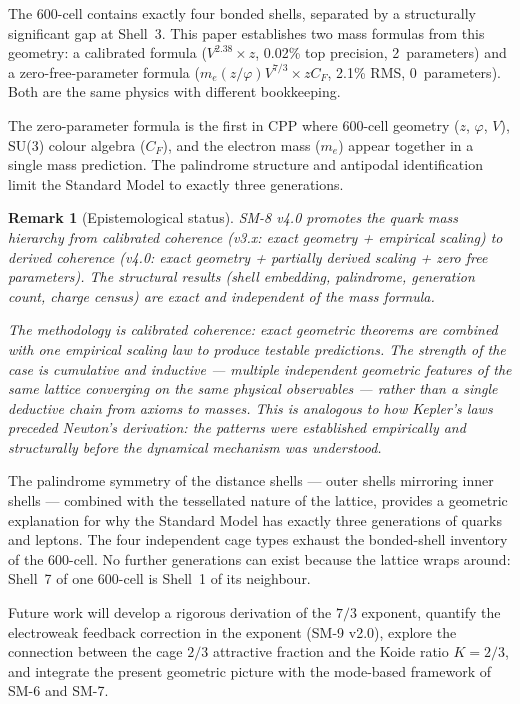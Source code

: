 \documentclass[11pt,letterpaper]{article}
\newtheorem{remark}[theorem]{Remark}
\newcommand{\phig}{\varphi}
\begin{document}
The 600-cell contains exactly four bonded shells, separated by a
structurally significant gap at Shell~3.  This paper establishes
two mass formulas from this geometry: a calibrated formula
($V^{2.38} \times z$, 0.02\% top precision, 2~parameters) and a
zero-free-parameter formula ($m_e(z/\phig) V^{7/3} \times z C_F$,
2.1\% RMS, 0~parameters).  Both are the same physics with
different bookkeeping.

The zero-parameter formula is the first in CPP where 600-cell
geometry ($z$, $\phig$, $V$), SU(3) colour algebra ($C_F$), and
the electron mass ($m_e$) appear together in a single mass
prediction.  The palindrome structure and antipodal identification
limit the Standard Model to exactly three generations.

\begin{remark}[Epistemological status]
SM-8 v4.0 promotes the quark mass hierarchy from calibrated
coherence (v3.x: exact geometry + empirical scaling) to derived
coherence (v4.0: exact geometry + partially derived scaling +
zero free parameters).  The structural results (shell embedding,
palindrome, generation count, charge census) are exact and
independent of the mass formula.

The methodology is \emph{calibrated coherence}: exact geometric
theorems are combined with one empirical scaling law to produce
testable predictions.  The strength of the case is cumulative and
inductive --- multiple independent geometric features of the same
lattice converging on the same physical observables --- rather than
a single deductive chain from axioms to masses.  This is analogous
to how Kepler's laws preceded Newton's derivation: the patterns
were established empirically and structurally before the dynamical
mechanism was understood.
\end{remark}

The palindrome symmetry of the distance shells --- outer shells
mirroring inner shells --- combined with the tessellated nature of
the lattice, provides a geometric explanation for why the Standard
Model has exactly three generations of quarks and leptons.  The
four independent cage types exhaust the bonded-shell inventory of
the 600-cell.  No further generations can exist because the lattice
wraps around: Shell~7 of one 600-cell is Shell~1 of its neighbour.

Future work will develop a rigorous derivation of the $7/3$
exponent, quantify the electroweak feedback correction in the
exponent (SM-9 v2.0), explore the connection between the cage $2/3$
attractive fraction and the Koide ratio $K = 2/3$, and integrate
the present geometric picture with the mode-based framework of
SM-6 and SM-7.
\end{document}
